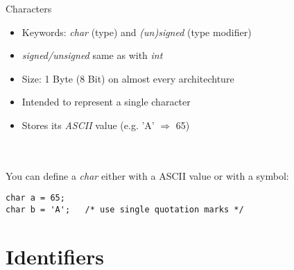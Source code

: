 \begin{frame}[fragile]{Characters}
	\begin{itemize}
		\item Keywords: \textit{char} (type) and \textit{(un)signed} (type modifier)
		\item \textit{signed/unsigned} same as with \textit{int}
		\item Size: 1 Byte (8 Bit) on almost every architechture
		\item Intended to represent a single character
		\item Stores its \textit{ASCII} value (e.g. 'A' $\Rightarrow$ 65)
	\end{itemize}\ \\
	\ \\
	You can define a \textit{char} either with a ASCII value or with a symbol:
	\begin{lstlisting}[numbers=none]
char a = 65;
char b = 'A';	/* use single quotation marks */
\end{lstlisting}
\end{frame}
\section{Identifiers}
